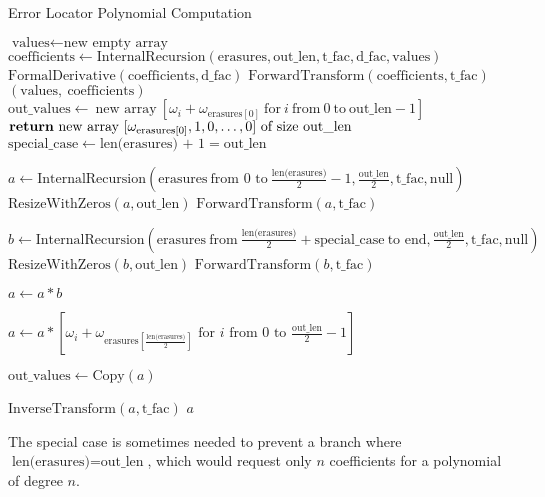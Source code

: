\begin{algorithm}
    \caption{Error Locator Polynomial Computation}
    \begin{algorithmic}
            \State $\text{values} \gets \text{new empty array}$
            \State $\text{coefficients} \gets \text{InternalRecursion}(\text{erasures}, \text{out\_len}, \text{t\_fac}, \text{d\_fac}, \text{values})$
            \State $\text{FormalDerivative}(\text{coefficients}, \text{d\_fac})$
            \State $\text{ForwardTransform}(\text{coefficients}, \text{t\_fac})$
            \State \Return $(\text{values},\ \text{coefficients})$ 
        \EndFunction
                    \State $\text{out\_values} \gets\ \text{new array}\ [\omega_i + \omega_{\text{erasures}[0]}\ \text{for}\ i\ \text{from}\ 0\ \text{to}\ \text{out\_len} - 1]$
                \EndIf
                \State $\Return\ \text{new array}\ [\omega_{\text{erasures}[0]}, 1, 0, \ldots, 0]\ \text{of size}\ \text{out\_len}$
            \EndIf
            \State $\text{special\_case} \gets \text{len(erasures) + 1} = \text{out\_len}$

            \State $a \gets \text{InternalRecursion}(\text{erasures}\ \text{from 0 to}\ \frac{\text{len(erasures)}}{2} - 1 , \frac{\text{out\_len}}{2}, \text{t\_fac}, \text{null})$
            \State $\text{ResizeWithZeros}(a, \text{out\_len})$
            \State $\text{ForwardTransform}(a, \text{t\_fac})$

            \State $b \gets \text{InternalRecursion}(\text{erasures}\ \text{from}\ \frac{\text{len(erasures)}}{2} + \text{special\_case}\ \text{to end}, \frac{\text{out\_len}}{2}, \text{t\_fac}, \text{null})$
            \State $\text{ResizeWithZeros}(b, \text{out\_len})$
            \State $\text{ForwardTransform}(b, \text{t\_fac})$

            \State $a \gets a * b$ 

                \State $a \gets a * [\omega_i + \omega_{\text{erasures}[\frac{\text{len(erasures)}}{2}]} \text{ for } i \text{ from } 0 \text{ to } \frac{\text{out\_len}}{2} - 1]$
            \EndIf

             
                \State $\text{out\_values} \gets \text{Copy}(a)$ 
            \EndIf

            \State $\text{InverseTransform}(a, \text{t\_fac})$ 
            \State \Return $a$
        \EndFunction
    \end{algorithmic}
\end{algorithm}

The special case is sometimes needed to prevent a branch where $\text{len(erasures)} = \text{out\_len}$, which would request only $n$ coefficients for a polynomial of degree $n$.
